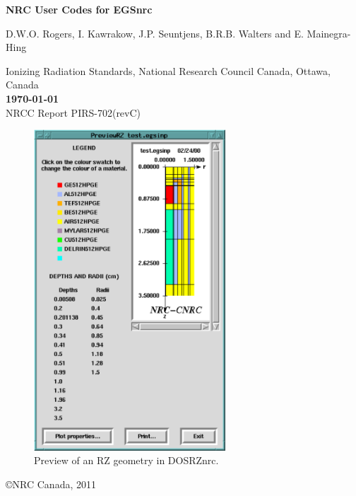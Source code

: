 \documentclass[12pt,twoside]{article}  %
\newcommand{\cen}[1]{\begin{center} #1 \end{center} }
\begin{document}
\begin{center} 
{\sffamily \bfseries {\Huge NRC User Codes for EGSnrc}
\vspace{5mm}\\}
\begin{Large}
D.W.O. Rogers, I. Kawrakow, J.P. Seuntjens,  B.R.B. Walters and E.
Mainegra-Hing \\
\end{Large}
Ionizing Radiation Standards,
National Research Council Canada, Ottawa, Canada\\


\vspace{3mm}
{\bfseries
\today}
\vspace{3mm}\\
\hfill NRCC Report {\sf PIRS-702(revC)} \vspace*{2mm}\\

\begin{figure}[h]
\begin{center}
\includegraphics[height=12cm]{figures/PreviewRZ_example}
\\Preview of an RZ geometry in DOSRZnrc.
\end{center}
\end{figure}

\vfill
\begin{latexonly}
\end{latexonly}

\copyright NRC Canada, 2011
\end{center}
\newpage   %
\mbox{}
\end{document}
